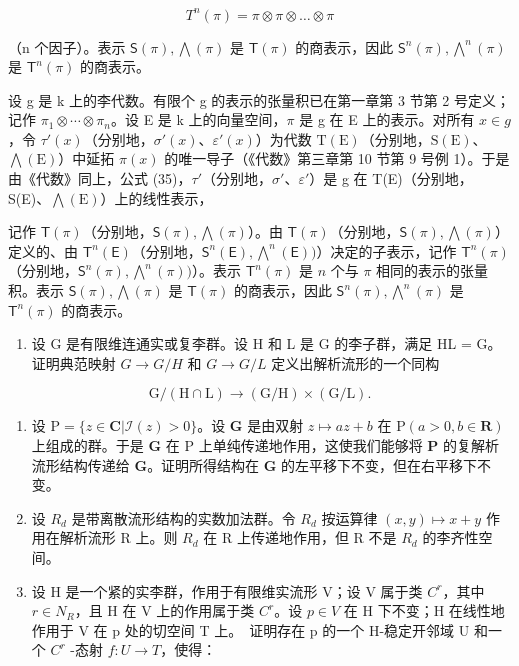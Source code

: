 \[
T ^ {n} (\pi) = \pi \otimes \pi \otimes \dots \otimes \pi
\]

（n 个因子）。表示 \(\mathsf{S}(\pi), \bigwedge (\pi)\) 是 \(\mathsf{T}(\pi)\) 的商表示，因此 \(\mathsf{S}^n (\pi), \bigwedge^n (\pi)\) 是 \(\mathsf{T}^n (\pi)\) 的商表示。

设 g 是 k 上的李代数。有限个 g 的表示的张量积已在第一章第 3 节第 2 号定义；记作 \(\pi_{1}\otimes\cdots\otimes\pi_{n}\)。设 E 是 k 上的向量空间，\(\pi\) 是 g 在 E 上的表示。对所有 \(x\in g\)，令 \(\tau'(x)\)（分别地，\(\sigma'(x)\)、\(\varepsilon'(x)\)）为代数 \(\mathrm{T(E)}\)（分别地，\(\mathrm{S(E)}\)、\(\bigwedge(\mathrm{E})\)）中延拓 \(\pi(x)\) 的唯一导子（《代数》第三章第 10 节第 9 号例 1）。于是由《代数》同上，公式 (35)，\(\tau'\)（分别地，\(\sigma'\)、\(\varepsilon'\)）是 g 在 T(E)（分别地，S(E)、\(\bigwedge(\mathrm{E})\)）上的线性表示，

记作 \(\mathsf{T}(\pi)\)（分别地，\(\mathsf{S}(\pi),\bigwedge (\pi)\)）。由 \(\mathsf{T}(\pi)\)（分别地，\(\mathsf{S}(\pi),\bigwedge (\pi)\)）定义的、由 \(\mathsf{T}^n (\mathsf{E})\)（分别地，\(\mathsf{S}^n (\mathsf{E}),\bigwedge^n (\mathsf{E}))\)）决定的子表示，记作 \(\mathsf{T}^n (\pi)\)（分别地，\(\mathsf{S}^n (\pi),\bigwedge^n (\pi))\)）。表示 \(\mathsf{T}^n (\pi)\) 是 \(n\) 个与 \(\pi\) 相同的表示的张量积。表示 \(\mathsf{S}(\pi),\bigwedge (\pi)\) 是 \(\mathsf{T}(\pi)\) 的商表示，因此 \(\mathsf{S}^n (\pi),\bigwedge^n (\pi)\) 是 \(\mathsf{T}^n (\pi)\) 的商表示。



\begin{enumerate}
\def\labelenumi{\arabic{enumi}.}
\tightlist
\item
  设 G 是有限维连通实或复李群。设 H 和 L 是 G 的李子群，满足 HL = G。证明典范映射 \(G \rightarrow G/H\) 和 \(G \rightarrow G/L\) 定义出解析流形的一个同构
\end{enumerate}

\[
\mathrm{G} / (\mathrm{H} \cap \mathrm{L}) \rightarrow (\mathrm{G} / \mathrm{H}) \times (\mathrm{G} / \mathrm{L}).
\]

\begin{enumerate}
\def\labelenumi{\arabic{enumi}.}
\setcounter{enumi}{1}
\item
  设 \(\mathrm{P} = \{z\in \mathbf{C}|\mathcal{I}(z) > 0\}\)。设 \(\mathbf{G}\) 是由双射 \(z\mapsto az + b\) 在 \(\mathrm{P}(a > 0,b\in \mathbf{R})\) 上组成的群。于是 \(\mathbf{G}\) 在 \(\mathrm{P}\) 上单纯传递地作用，这使我们能够将 \(\mathbf{P}\) 的复解析流形结构传递给 \(\mathbf{G}\)。证明所得结构在 \(\mathbf{G}\) 的左平移下不变，但在右平移下不变。
\item
  设 \(R_{d}\) 是带离散流形结构的实数加法群。令 \(R_{d}\) 按运算律 \((x,y)\mapsto x+y\) 作用在解析流形 R 上。则 \(R_{d}\) 在 R 上传递地作用，但 R 不是 \(R_{d}\) 的李齐性空间。
\item
  设 H 是一个紧的实李群，作用于有限维实流形 V；设 V 属于类 \(C^{r}\)，其中 \(r \in N_{R}\)，且 H 在 V 上的作用属于类 \(C^{r}\)。设 \(p \in V\) 在 H 下不变；H 在线性地作用于 V 在 p 处的切空间 T 上。~证明存在 p 的一个 H-稳定开邻域 U 和一个 \(C^{r}\) -态射 \(f: U \to T\)，使得：
\end{enumerate}

